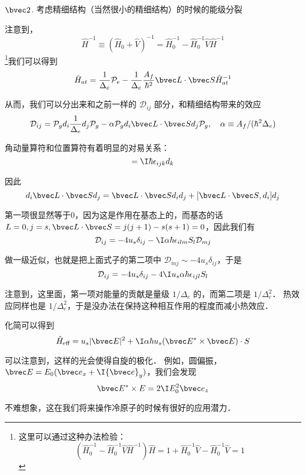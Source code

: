 {$\bvec 2$. }考虑精细结构（当然很小的精细结构）的时候的能级分裂

注意到，
\begin{equation}
{\hat H}^{-1} \equiv ({\hat H}_0+\hat{V})^{-1} = {\hat H}_0^{-1} - {\hat H}_0^{-1}\hat{V} {\hat H}^{-1}
\end{equation}
\footnote{这里可以通过这种办法检验：
\begin{equation}
({\hat H}_0^{-1} - {\hat H}_0^{-1}\hat{V} {\hat H}^{-1}) \hat{H}  = 1 + {\hat H}_0^{-1} \hat{V} - {\hat H}_0^{-1}\hat{V} = 1
\end{equation}
}我们可以得到
\begin{equation}
\hat{H}_{at} = \frac{1}{\Delta_e}\mathcal{P}_e-\frac{1}{\Delta_e}\frac{A_f}{\hbar^2}{\bvec L\cdot \bvec S}\hat{H}_{at}^{-1} 
\end{equation}

从而，我们可以分出来和之前一样的 $\mathcal{D}_{ij}$ 部分，和精细结构带来的效应
\begin{equation}
\mathcal{D}_{ij} = \mathcal{P}_g d_i \frac{1}{\Delta_e} d_j \mathcal{P}_g - \alpha \mathcal{P}_g d_i {\bvec L\cdot \bvec S}d_j\mathcal{P}_g,\quad \alpha \equiv A_f/(\hbar^2\Delta_e)
\end{equation}

角动量算符和位置算符有着明显的对易关系：
\begin{equation}
[L_i,d_j] = \I\hbar\epsilon_{ijk}d_k
\end{equation}

因此
\begin{equation}
d_i {\bvec L\cdot \bvec S}d_j = {\bvec L\cdot \bvec S}d_id_j + [{\bvec L\cdot \bvec S}, d_i]d_j
\end{equation}

第一项很显然等于0，因为这是作用在基态上的，而基态的话 $L=0, j = s, {\bvec L\cdot \bvec S} = j(j+1) - s(s+1) = 0$，因此我们有
\begin{equation}
\mathcal{D}_{ij} = -4u_s\delta_{ij} - \I\alpha\hbar\epsilon_{ilm} S_l \mathcal{D}_{mj}
\end{equation}

做一级近似，也就是把上面式子的第二项中 $\mathcal{D}_{mj} \sim -4u_s\delta_{ij}$，于是
\begin{equation}
\mathcal{D}_{ij} = -4u_s\delta_{ij} - 4\I u_s\alpha\hbar\epsilon_{ijl} S_l
\end{equation}

注意到，这里面，第一项对能量的贡献是量级 $1/\Delta_e$ 的，而第二项是 $1/\Delta_e^2$． 热效应同样也是 $1/\Delta_e^2$，于是没办法在保持这种相互作用的程度而减小热效应．

化简可以得到
\begin{equation}
\hat{H}_{\text{eff}} = u_s|{\bvec E}|^2 + \I \alpha\hbar u_s ({\bvec E^*\times \bvec E )\cdot S}
\end{equation}

可以注意到，这样的光会使得自旋的极化． 例如，圆偏振，${\bvec E} = E_0 ({\bvec e}_x + \I{\bvec e}_y)$，我们会发现
\begin{equation}
{\bvec E^*\times E} = 2\I E_0^2{\bvec e}_z
\end{equation}

不难想象，这在我们将来操作冷原子的时候有很好的应用潜力．
